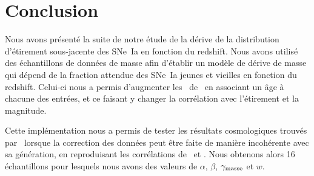 \documentclass[../main/main.tex]{subfiles}
\begin{document}


\section{Conclusion}\label{sec:simccl}

Nous avons présenté la suite de notre étude de la dérive de la distribution
d'étirement sous-jacente des SNe~Ia en fonction du redshift. Nous avons utilisé
des échantillons de données de masse afin d'établir un modèle de dérive de masse
qui dépend de la fraction attendue des SNe~Ia jeunes et vieilles en fonction du
redshift. Celui-ci nous a permis d'augmenter les \hostlib\
de~ en associant un âge à chacune des entrées, et ce
faisant y changer la corrélation avec l'étirement et la magnitude.

Cette implémentation nous a permis de tester les résultats cosmologiques trouvés
par \snana\ lorsque la correction des données peut être faite de manière
incohérente avec sa génération, en reproduisant les corrélations
de~\citetalias{scolnic2016} et \citetalias{popovic2021a}. Nous obtenons alors 16
échantillons pour lesquels nous avons des valeurs de $\alpha$, $\beta$,
$\gamma_{\rm masse}$ et $w$.
\end{document}
